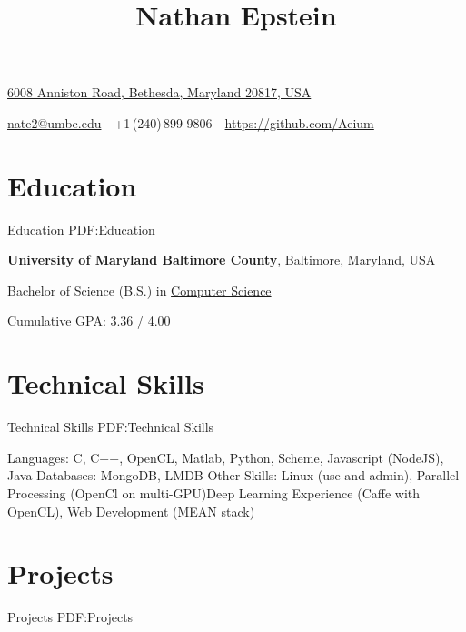 \documentclass[letterpaper,MMMyyyy,nonstop]{simpleresumecv}
\newcommand{\CVAuthor}{Nathan Epstein}
\newcommand{\CVWebpage}{https://github.com/Aeium}
\begin{document}

\title{\CVAuthor}

\begin{subtitle}
\href{https://www.google.com/maps?q=6008+Anniston+Road,+Bethesda,+Maryland+20817}
{6008 Anniston Road, Bethesda, Maryland 20817, USA}
\par
\href{mailto:nate2@umbc.edu}
{nate2@umbc.edu}
\,\SubBulletSymbol\,
+1\,(240)\,899-9806
\,\SubBulletSymbol\,
\href{\CVWebpage}
{\CVWebpage}
\end{subtitle}

\begin{body}


\section
{Education}
{Education}
{PDF:Education}

\href{http://umbc.edu/}
{\textbf{University of Maryland Baltimore County}},
Baltimore, Maryland, USA

\GapNoBreak
\BulletItem
Bachelor of Science (B.S.) in
\href{http://www.csee.umbc.edu/}
{Computer Science}
\hfill
{}
\begin{detail}
\SubBulletItem
Cumulative GPA: 3.36 / 4.00
\end{detail}


\section
{Technical Skills}
{Technical Skills}
{PDF:Technical Skills}

\GapNoBreak
\BulletItem
Languages: C, C++, OpenCL, Matlab, Python, Scheme, Javascript (NodeJS), Java
\hfill
\BulletItem
Databases: MongoDB, LMDB
\hfill
\BulletItem
Other Skills: Linux (use and admin), Parallel Processing (OpenCl on multi-GPU)\newline Deep Learning Experience (Caffe with OpenCL), Web Development (MEAN stack)
\hfill


\section
{Projects}
{Projects}
{PDF:Projects}


\end{body}
\end{document}
